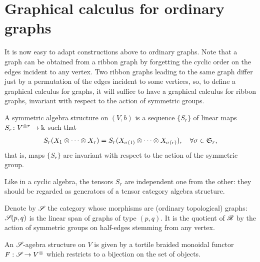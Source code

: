 \section{Graphical calculus for ordinary graphs}
\label{sec:graph-calc-graphs}

It is now easy to adapt constructions above to ordinary graphs. 
Note that a graph can be obtained from a ribbon graph by forgetting
the cyclic order on the edges incident to any vertex. Two ribbon
graphs leading to the same graph differ just by a permutation of the
edges incident to some vertices, so, to define a graphical calculus
for graphs, it will suffice to have a graphical calculus for ribbon
graphs, invariant with respect to the action of symmetric groups.

\begin{definition}
  \label{dfn:symmetric-algebra}
  A symmetric algebra structure on $(V, b)$ is a sequence
  $\{S_r\}$ of linear maps $S_r \colon V\sp{\otimes r} \to \Bbbk$ such that
  \begin{equation*}
    S_r (X_1 \otimes \dots \otimes X_r) = S_r
    (X_{\sigma(1)} \otimes\dots \otimes X_{\sigma(r)}), 
    \quad \forall\sigma\in\mathfrak{S}_{r},
  \end{equation*}
  that is, maps $\{S_r\}$ are invariant with respect to the action of
  the symmetric group.
\end{definition}
Like in a cyclic algebra, the tensors $S_r$ are independent one from
the other: they should be regarded as generators of a tensor category
algebra structure.
\begin{definition}
  \label{dfn:symmetric-graph-category}
  Denote by $\mathscr{S}_{}$ the category whose morphisms are (ordinary
  topological) graphs: $\mathscr{S}_{}(p,q)$ is the linear span of graphs of type
  $(p,q)$. It is the quotient of $\mathscr{R}_{}$ by the action of symmetric
  groups on half-edges stemming from any vertex.
\end{definition}  
\begin{definition}
  \label{dfn:sg-algebra}
  An $\mathscr{S}_{}$-agebra structure on $V$ is given by a tortile braided
  monoidal functor $F:\mathscr{S}_{} \to V^{\otimes}$ which restricts to a
  bijection on the set of objects.
\end{definition}

